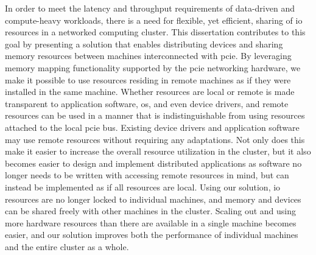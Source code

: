 In order to meet the latency and throughput requirements of data-driven and compute-heavy workloads, there is a need for flexible, yet efficient, sharing of \gls{io} resources in a networked computing cluster.
%
This dissertation contributes to this goal by presenting a solution that enables distributing devices and sharing memory resources between machines interconnected with \gls{pcie}.
%
By leveraging memory mapping functionality supported by the \gls{pcie} networking hardware, we make it possible to use resources residing in remote machines as if they were installed in the same machine.
%
Whether resources are local or remote is made transparent to application software, \gls{os}, and even device drivers, and remote resources can be used in a manner that is indistinguishable from using resources attached to the local \gls{pcie} bus.
%
Existing device drivers and application software may use remote resources without requiring any adaptations.
%
Not only does this make it easier to increase the overall resource utilization in the cluster, but it also becomes easier to design and implement distributed applications as software no longer needs to be written with accessing remote resources in mind,
but can instead be implemented as if all resources are local.
%
Using our solution, \gls{io} resources are no longer locked to individual machines, and memory and devices can be shared freely with other machines in the cluster.
%
Scaling out and using more hardware resources than there are available in a single machine becomes easier, and our solution improves both the performance of individual machines and the entire cluster as a whole.



